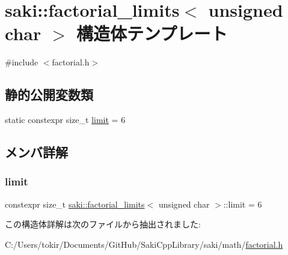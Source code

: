 \hypertarget{structsaki_1_1factorial__limits_3_01unsigned_01char_01_4}{}\section{saki\+:\+:factorial\+\_\+limits$<$ unsigned char $>$ 構造体テンプレート}
\label{structsaki_1_1factorial__limits_3_01unsigned_01char_01_4}


{\ttfamily \#include $<$factorial.\+h$>$}

\subsection*{静的公開変数類}
\begin{DoxyCompactItemize}
\item 
static constexpr size\+\_\+t \mbox{\hyperlink{structsaki_1_1factorial__limits_3_01unsigned_01char_01_4_ae3b367c63ab92b1ffdf1a65b41c5bc51}{limit}} = 6
\end{DoxyCompactItemize}


\subsection{メンバ詳解}
\mbox{\label{structsaki_1_1factorial__limits_3_01unsigned_01char_01_4_ae3b367c63ab92b1ffdf1a65b41c5bc51}} 
\subsubsection{\texorpdfstring{limit}{limit}}
{\footnotesize\ttfamily constexpr size\+\_\+t \mbox{\hyperlink{structsaki_1_1factorial__limits}{saki\+::factorial\+\_\+limits}}$<$ unsigned char $>$\+::limit = 6\hspace{0.3cm}{\ttfamily [static]}}



この構造体詳解は次のファイルから抽出されました\+:\begin{DoxyCompactItemize}
\item 
C\+:/\+Users/tokir/\+Documents/\+Git\+Hub/\+Saki\+Cpp\+Library/saki/math/\mbox{\hyperlink{factorial_8h}{factorial.\+h}}\end{DoxyCompactItemize}
